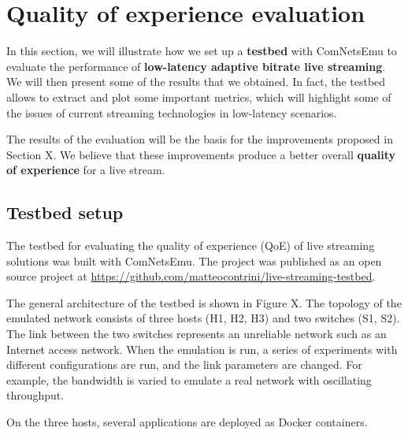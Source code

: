 \chapter{Quality of experience evaluation}
\label{cha:eval}

In this section, we will illustrate how we set up a \textbf{testbed} with ComNetsEmu to evaluate the performance of \textbf{low-latency adaptive bitrate live streaming}. We will then present some of the results that we obtained. In fact, the testbed allows to extract and plot some important metrics, which will highlight some of the issues of current streaming technologies in low-latency scenarios.

The results of the evaluation will be the basis for the improvements proposed in Section X. We believe that these improvements produce a better overall \textbf{quality of experience} for a live stream.


\section{Testbed setup}
\label{sec:eval/testbed}

The testbed for evaluating the quality of experience (QoE) of live streaming solutions was built with ComNetsEmu. The project was published as an open source project at \url{https://github.com/matteocontrini/live-streaming-testbed}.

The general architecture of the testbed is shown in Figure X. The topology of the emulated network consists of three hosts (H1, H2, H3) and two switches (S1, S2). The link between the two switches represents an unreliable network such as an Internet access network. When the emulation is run, a series of experiments with different configurations are run, and the link parameters are changed. For example, the bandwidth is varied to emulate a real network with oscillating throughput.

On the three hosts, several applications are deployed as Docker containers.

